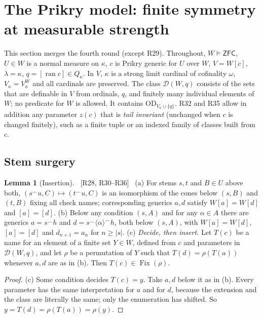 \documentclass[11pt,letterpaper]{article}
\theoremstyle{definition}
\newtheorem{lemma}[definition]{Lemma}
\numberwithin{equation}{section}
\newcommand{\ZFC}{\mathsf{ZFC}}
\newcommand{\OD}{\mathrm{OD}}
\newcommand{\ran}{\operatorname{ran}}
\newcommand{\src}[1]{\unskip\ {\normalfont\small\sffamily\color{Olive}[#1]}\ }
\newcommand{\R}[1]{\textsf{R#1}}
\begin{document}
\section{The Prikry model: finite symmetry at measurable strength}\label{sec:prikry}

This section merges the fourth round (except \R{29}). Throughout, $W\models\ZFC$, $U\in W$ is a normal measure on $\kappa$, $c$ is Prikry generic for $U$ over $W$, $V=W[c]$, $\lambda=\kappa$, $q=[\ran c]\in Q_\kappa$. In $V$, $\kappa$ is a strong limit cardinal of cofinality $\omega$, $V_\kappa=V^W_\kappa$ and all cardinals are preserved. The class $\mathcal D(W,q)$ consists of the sets that are definable in $V$ from ordinals, $q$, and finitely many individual elements of $W$; no predicate for $W$ is allowed. It contains $\OD_{V_\kappa\cup\{q\}}$. \R{32} and \R{35} allow in addition any parameter $z(c)$ that is \emph{tail invariant} (unchanged when $c$ is changed finitely), such as a finite tuple or an indexed family of classes built from $c$.

\subsection{Stem surgery}

\begin{lemma}[Insertion]\label{lem:insertion}\src{R28, R30--R36}
(a) For stems $s,t$ and $B\in U$ above both, $(s^\frown u,C)\mapsto(t^\frown u,C)$ is an isomorphism of the cones below $(s,B)$ and $(t,B)$ fixing all check names; corresponding generics $a,d$ satisfy $W[a]=W[d]$ and $[a]=[d]$. (b) Below any condition $(s,A)$ and for any $\alpha\in A$ there are generics $a=s^\frown h$ and $d=s^\frown\langle\alpha\rangle^\frown h$, both below $(s,A)$, with $W[a]=W[d]$, $[a]=[d]$ and $d_{n+1}=a_n$ for $n\ge|s|$. (c) \emph{Decide, then insert.} Let $T(c)$ be a name for an element of a finite set $Y\in W$, defined from $c$ and parameters in $\mathcal D(W,q)$, and let $\rho$ be a permutation of $Y$ such that $T(d)=\rho(T(a))$ whenever $a,d$ are as in (b). Then $T(c)\in\operatorname{Fix}(\rho)$.
\end{lemma}

\begin{proof}
(c) Some condition decides $T(c)=y$. Take $a,d$ below it as in (b). Every parameter has the same interpretation for $a$ and for $d$, because the extension and the class are literally the same; only the enumeration has shifted. So $y=T(d)=\rho(T(a))=\rho(y)$.
\end{proof}
\end{document}
